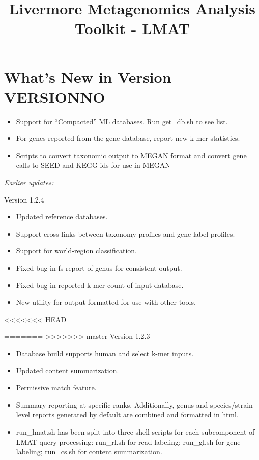\documentclass[11pt]{article}
\title{Livermore Metagenomics Analysis Toolkit - LMAT}
\newcommand{\lmatver}{VERSIONNO}
\begin{document}
\maketitle
\tableofcontents

\section{What's New in Version \lmatver}


\begin{itemize}
\item
Support for ``Compacted'' ML databases.  Run get\_db.sh to see list.
\item
For genes reported from the gene database, report new k-mer statistics.
\item
Scripts to convert taxonomic output to MEGAN format and convert gene calls to SEED and KEGG ids for use in MEGAN

\end{itemize}


{\it Earlier updates:}


Version 1.2.4

\begin{itemize}
\item
Updated reference databases.
\item
Support cross links between taxonomy profiles and gene label profiles.

\item
Support for world-region classification.
\item
Fixed bug in fs-report of genus for consistent output.

\item
Fixed bug in reported k-mer count of input database.
\item
New utility for output formatted for use with other tools.

\end{itemize}

<<<<<<< HEAD

=======
>>>>>>> master
Version 1.2.3

\begin{itemize}
\item 
Database build supports human and select k-mer inputs.
\item 
Updated content summarization.
\item
Permissive match feature.
\item
Summary reporting at specific ranks.  Additionally, genus and species/strain level reports generated by default are combined and formatted in html.
\item
run\_lmat.sh has been split into three shell scripts for each subcomponent of LMAT query processing:  run\_rl.sh for read labeling;  run\_gl.sh for gene labeling;  run\_cs.sh for content summarization.



\end{itemize}
\end{document}

